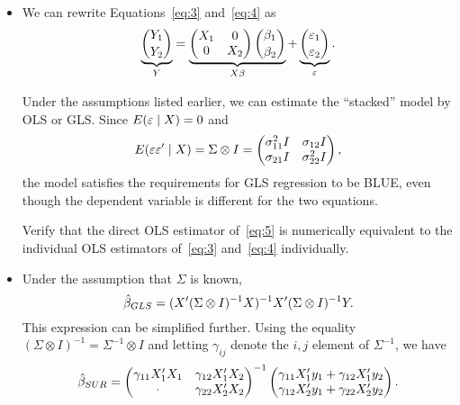 \begin{itemize}[leftmargin=0pt]
\item We can rewrite Equations~\eqref{eq:3} and~\eqref{eq:4} as
  \begin{equation}\label{eq:5}
    \underbrace{\binom{Y_1}{Y_2}}_Y
    = \underbrace{\begin{pmatrix} X_1 & 0 \\ 0 & X_2 \end{pmatrix}
    \binom{\beta_1}{\beta_2}}_{X\beta} +
    \underbrace{\binom{\vep_1}{\vep_2}}_\vep.
  \end{equation}

  Under the assumptions listed earlier, we can estimate the
  ``stacked'' model by OLS or GLS.
  Since $E(\varepsilon \mid X) = 0$ and
  \begin{equation*}
    E(\varepsilon \varepsilon' \mid X) = \Sigma \otimes I =
    \begin{pmatrix}
      \sigma^2_{11} I & \sigma_{12} I \\ \sigma_{21} I & \sigma^2_{22}
      I
    \end{pmatrix},
  \end{equation*}
  the model satisfies the requirements for GLS regression to be BLUE,
  even though the dependent variable is different for the two
  equations.

  \begin{hw}
    Verify that the direct OLS estimator of~\eqref{eq:5} is
    numerically equivalent to the individual OLS estimators
    of~\eqref{eq:3} and~\eqref{eq:4} individually.
  \end{hw}

\item Under the assumption that $\Sigma$ is known, 
  \begin{equation*}
    \hat{\beta}_{GLS} = ( X' (\Sigma \otimes I)^{-1} X )^{-1} 
                  X' (\Sigma \otimes I)^{-1} Y.
  \end{equation*}
  This expression can be simplified further. Using the equality
  $(\Sigma \otimes I)^{-1} = \Sigma^{-1} \otimes I$ and letting
  $\gamma_{ij}$ denote the $i,j$ element of $\Sigma^{-1}$, we have
  \begin{equation*}
    \hat{\beta}_{SUR} = \begin{pmatrix}
      \gamma_{11} X_1'X_1 & \gamma_{12} X_1'X_2 \\
      \cdot & \gamma_{22} X_2'X_2
    \end{pmatrix}^{-1}
    \begin{pmatrix}
      \gamma_{11} X_1'y_1 + \gamma_{12} X_1'y_2 \\
      \gamma_{12} X_2'y_1 + \gamma_{22} X_2'y_2
    \end{pmatrix}.
  \end{equation*}


\end{itemize}
